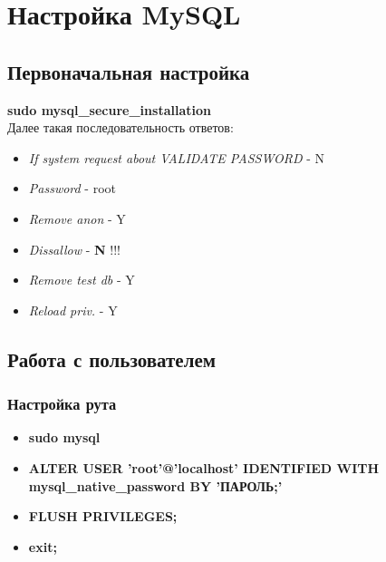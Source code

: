 \documentclass[14pt,a4paper,oneside]{extarticle}
\begin{document}
    \newpage

    \section{Настройка MySQL}

        \subsection{Первоначальная настройка}

            \noindent\textbf{sudo mysql\_secure\_installation}\\
            Далее такая последовательность ответов:\\

            \begin{itemize}
                \item \textit{If system request about VALIDATE PASSWORD} - N\\
                \item \textit{Password} - root\\
                \item \textit{Remove anon} - Y\\
                \item \textit{Dissallow} - \textbf{N} !!!\\
                \item \textit{Remove test db} - Y\\
                \item \textit{Reload priv.} - Y\\
            \end{itemize}

        \subsection{Работа с пользователем}

            \subsubsection{Настройка рута}
                \begin{itemize}
                    \item \textbf{sudo mysql}
                    \item \textbf{ALTER USER 'root'@'localhost' IDENTIFIED WITH mysql\_native\_password BY 'ПАРОЛЬ;'}
                    \item \textbf{FLUSH PRIVILEGES;}
                    \item \textbf{exit;}
                \end{itemize}
\end{document}

